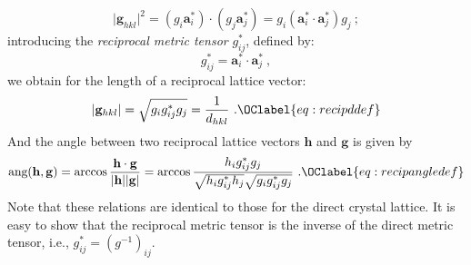 \[
	\vert\mathbf{g}_{hkl}\vert^2 = (g_i\mathbf{a}^{\ast}_i)\cdot(g_j\mathbf{a}^{\ast}_j) = 
	g_i (\mathbf{a}^{\ast}_i\cdot\mathbf{a}^{\ast}_j) g_j \ ;
\]
introducing the \textit{reciprocal metric tensor} $g^{\ast}_{ij}$, defined by:
\begin{equation}
	g^{\ast}_{ij} = \mathbf{a}^{\ast}_i\cdot\mathbf{a}^{\ast}_j \ ,
\end{equation}
we obtain for the length of a reciprocal lattice vector:
\begin{equation}
	\vert\mathbf{g}_{hkl}\vert = \sqrt{g_i g^{\ast}_{ij}g_j} = \frac{1}{d_{hkl}} \ .\OClabel{eq:recipddef}
\end{equation}
And the angle between two reciprocal lattice  vectors $\mathbf{h}$ and $\mathbf{g}$ is given by
\begin{equation}
	\text{ang}(\mathbf{h},\mathbf{g}) = \arccos\frac{\mathbf{h}\cdot\mathbf{g}}{\vert\mathbf{h}\vert\vert\mathbf{g}\vert} =
	\arccos\frac{h_i g^{\ast}_{ij}g_j}{\sqrt{h_i g^{\ast}_{ij}h_j}\sqrt{g_i g^{\ast}_{ij}g_j}}\ .\OClabel{eq:recipangledef}
\end{equation}
Note that these relations are identical to those for the direct crystal lattice.  It is easy to show that the reciprocal metric tensor is the inverse of the direct metric tensor, i.e., $g^{\ast}_{ij} = (g^{-1})_{ij}$.

